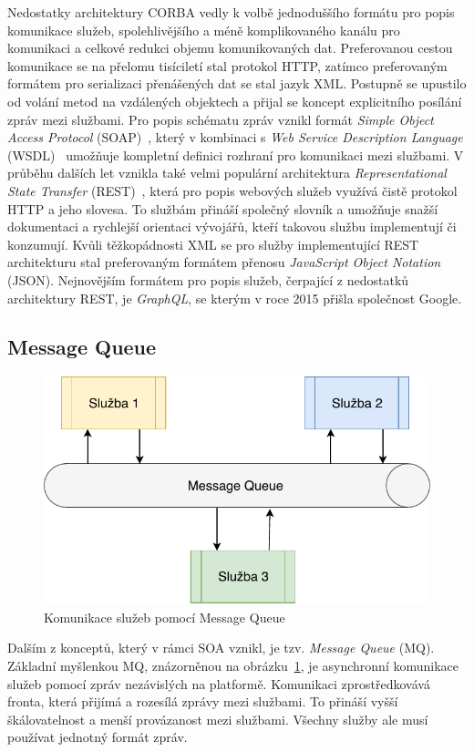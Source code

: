 Nedostatky architektury CORBA vedly k volbě jednoduššího
formátu pro popis komunikace služeb, spolehlivějšího a méně
komplikovaného kanálu pro komunikaci a celkové redukci
objemu komunikovaných dat. Preferovanou cestou komunikace
se na přelomu tisíciletí stal protokol HTTP, zatímco preferovaným formátem
pro serializaci přenášených dat se stal jazyk XML.
Postupně se upustilo od volání metod na vzdálených objektech a přijal
se koncept explicitního posílání zpráv mezi službami.
Pro popis schématu zpráv vznikl formát \textit{Simple Object Access
Protocol} (SOAP)~\cite{box2000simple}, který v kombinaci s
\textit{Web Service Description Language} (WSDL)~\cite{christensen2001web}
umožňuje kompletní definici rozhraní pro komunikaci mezi službami.
V průběhu dalších let vznikla také velmi populární architektura
\textit{Representational State Transfer} (REST)~\cite{fielding2000rest},
která pro popis webových služeb využívá čistě protokol HTTP a jeho slovesa.
To službám přináší společný slovník a umožňuje snažší dokumentaci
a rychlejší orientaci vývojářů, kteří takovou službu implementují či konzumují.
Kvůli těžkopádnosti XML se pro služby implementující REST architekturu stal
preferovaným formátem přenosu \textit{JavaScript Object Notation} (JSON).
Nejnovějším formátem pro popis služeb, čerpající z nedostatků architektury REST, je
\textit{GraphQL}, se kterým v roce 2015 přišla společnost Google.

\subsection{Message Queue}

\begin{figure}
    \centering
    \includegraphics[keepaspectratio=true, width=0.5\linewidth]{figures/message-queue.pdf}
    \caption{Komunikace služeb pomocí Message Queue}
    \label{fig:message-queue}
\end{figure}

Dalším z konceptů, který v rámci SOA vznikl, je tzv. \textit{Message Queue} (MQ).
Základní myšlenkou MQ, znázorněnou na obrázku~\ref{fig:message-queue},
je asynchronní komunikace služeb pomocí zpráv nezávislých
na platformě. Komunikaci zprostředkovává fronta, která přijímá a rozesílá
zprávy mezi službami. To přináší vyšší škálovatelnost a menší provázanost
mezi službami. Všechny služby ale musí používat jednotný formát zpráv.

